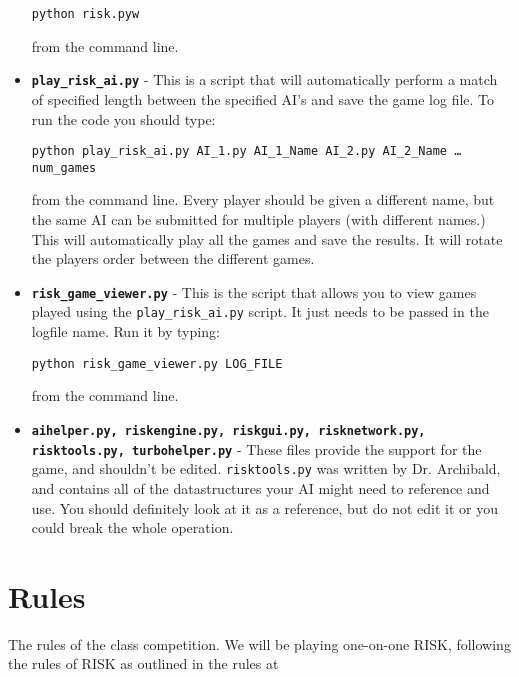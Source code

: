 \documentclass[10pt,a4paper]{article}
\begin{document}
\begin{itemize}
\begin{center}
\texttt{python risk.pyw } 
\end{center}

from the command line.

\item \textbf{\texttt{play\_risk\_ai.py}} - This is a script that will automatically perform a match of specified length between the specified AI's and save the game log file. To run the code you should type: 

\begin{center}
\begin{footnotesize}
\texttt{python play\_risk\_ai.py AI\_1.py AI\_1\_Name AI\_2.py AI\_2\_Name \ldots num\_games} 
\end{footnotesize}
\end{center}

from the command line.  Every player should be given a different name, but the same AI can be submitted for multiple players (with different names.)  This will automatically play all the games and save the results.  It will rotate the players order between the different games.

\item \textbf{\texttt{risk\_game\_viewer.py}} - This is the script that allows you to view games played using the \texttt{play\_risk\_ai.py} script.  It just needs to be passed in the logfile name.  Run it by typing:

\begin{center}
\texttt{python risk\_game\_viewer.py LOG\_FILE} 
\end{center}

from the command line.

\item \textbf{\texttt{aihelper.py, riskengine.py, riskgui.py, risknetwork.py, risktools.py, turbohelper.py}} - These files provide the support for the game, and shouldn't be edited.  \texttt{risktools.py} was written by Dr. Archibald, and contains all of the datastructures your AI might need to reference and use.  You should definitely look at it as a reference, but do not edit it or you could break the whole operation.
\end{itemize}

\section*{Rules}
The rules of the class competition.  We will be playing one-on-one RISK, following the rules of RISK as outlined in the rules at 
\end{document}
